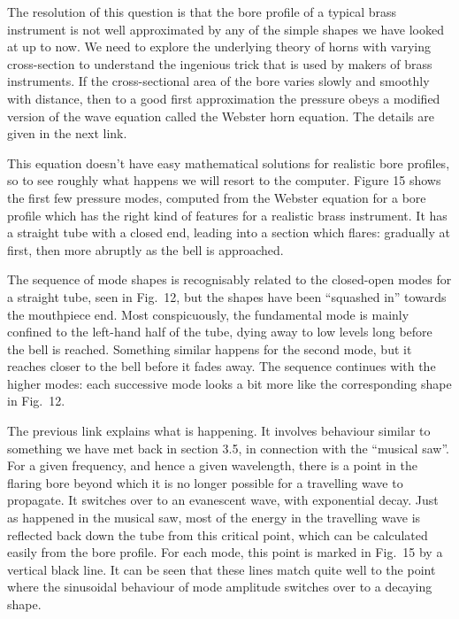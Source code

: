   The resolution of this question is that the bore profile of a typical brass 
  instrument is not well approximated by any of the simple shapes we have 
  looked at up to now. We need to explore the underlying theory of horns with 
  varying cross-section to understand the ingenious trick that is used by 
  makers of brass instruments. If the cross-sectional area of the bore varies 
  slowly and smoothly with distance, then to a good first approximation the 
  pressure obeys a modified version of the wave equation called the Webster 
  horn equation. The details are given in the next link. 

  This equation doesn't have easy mathematical solutions for realistic bore 
  profiles, so to see roughly what happens we will resort to the computer. 
  Figure 15 shows the first few pressure modes, computed from the Webster 
  equation for a bore profile which has the right kind of features for a 
  realistic brass instrument. It has a straight tube with a closed end, leading 
  into a section which flares: gradually at first, then more abruptly as the 
  bell is approached. 


  The sequence of mode shapes is recognisably related to the closed-open modes 
  for a straight tube, seen in Fig.\ 12, but the shapes have been ``squashed 
  in'' towards the mouthpiece end. Most conspicuously, the fundamental mode is 
  mainly confined to the left-hand half of the tube, dying away to low levels 
  long before the bell is reached. Something similar happens for the second 
  mode, but it reaches closer to the bell before it fades away. The sequence 
  continues with the higher modes: each successive mode looks a bit more like 
  the corresponding shape in Fig.\ 12. 

  The previous link explains what is happening. It involves behaviour similar 
  to something we have met back in section 3.5, in connection with the 
  ``musical saw''. For a given frequency, and hence a given wavelength, there 
  is a point in the flaring bore beyond which it is no longer possible for a 
  travelling wave to propagate. It switches over to an evanescent wave, with 
  exponential decay. Just as happened in the musical saw, most of the energy in 
  the travelling wave is reflected back down the tube from this critical point, 
  which can be calculated easily from the bore profile. For each mode, this 
  point is marked in Fig.\ 15 by a vertical black line. It can be seen that 
  these lines match quite well to the point where the sinusoidal behaviour of 
  mode amplitude switches over to a decaying shape. 

